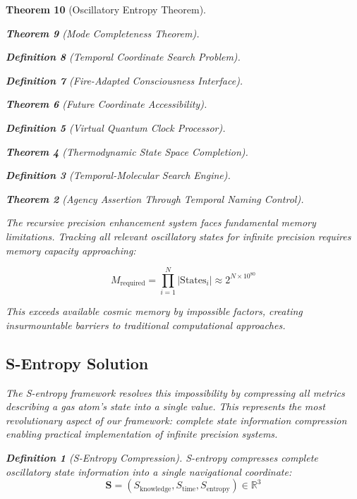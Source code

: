 \documentclass[12pt,a4paper]{article}
\newtheorem{theorem}{Theorem}[section]
\newtheorem{definition}[theorem]{Definition}
\begin{document}
\begin{theorem}[Oscillatory Entropy Theorem]
\begin{theorem}[Mode Completeness Theorem]
\begin{enumerate}
\begin{definition}[Temporal Coordinate Search Problem]
\begin{algorithm}
\begin{definition}[Fire-Adapted Consciousness Interface]
\begin{theorem}[Future Coordinate Accessibility]
\begin{definition}[Virtual Quantum Clock Processor]
\begin{itemize}
\begin{itemize}
\begin{theorem}[Thermodynamic State Space Completion]
\begin{definition}[Temporal-Molecular Search Engine]
\begin{theorem}[Agency Assertion Through Temporal Naming Control]
\begin{remark}
The recursive precision enhancement system faces fundamental memory limitations. Tracking all relevant oscillatory states for infinite precision requires memory capacity approaching:

$$M_{\text{required}} = \prod_{i=1}^{N} |\text{States}_i| \approx 2^{N \times 10^{80}}$$

This exceeds available cosmic memory by impossible factors, creating insurmountable barriers to traditional computational approaches.

\subsection{S-Entropy Solution}

The S-entropy framework resolves this impossibility by compressing all metrics describing a gas atom's state into a single value. This represents the most revolutionary aspect of our framework: complete state information compression enabling practical implementation of infinite precision systems.

\begin{definition}[S-Entropy Compression]
S-entropy compresses complete oscillatory state information into a single navigational coordinate:
$$\mathbf{S} = (S_{\text{knowledge}}, S_{\text{time}}, S_{\text{entropy}}) \in \mathbb{R}^3$$
\end{definition}

\begin{figure}[h]
\centering
{}
\end{figure}
\end{remark}
\end{theorem}
\end{definition}
\end{theorem}
\end{itemize}
\end{itemize}
\end{definition}
\end{theorem}
\end{definition}
\end{algorithm}
\end{definition}
\end{enumerate}
\end{theorem}
\end{theorem}
\end{document}
